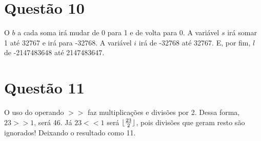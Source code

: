 \documentclass{article}
\DeclarePairedDelimiter\floor{\lfloor}{\rfloor}
\begin{document}
\section{Questão 10}
\hspace{4mm} O $b$ a cada soma irá mudar de 0 para 1 e de volta para 0. A variável $s$ irá somar 1 até 32767 e irá para -32768. A variável $i$ irá de -32768 até 32767. E, por fim, $l$ de -2147483648 até 2147483647.

\section{Questão 11}
\hspace{4mm} O uso do operando $>>$ faz multiplicações e divisões por 2. Dessa forma, $23 >> 1$, será 46. Já $23 << 1$ será $\floor{\frac{23}{2}}$, pois divisões que geram resto são ignorados! Deixando o resultado como 11.
\end{document}
